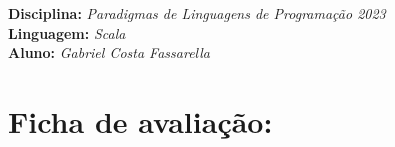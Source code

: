 



\noindent
\textbf{Disciplina:} \textit{Paradigmas de Linguagens de Programa\c{c}\~{a}o 2023}\\
\textbf{Linguagem:} \textit{Scala}\\
\textbf{Aluno:} \textit{ \color{blue} Gabriel Costa Fassarella}


\section*{Ficha de avalia\c{c}\~{a}o:}



